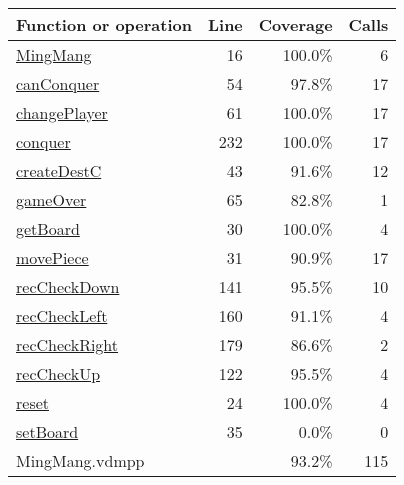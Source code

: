 \bigskip
\begin{longtable}{|l|r|r|r|}
\hline
Function or operation & Line & Coverage & Calls \\
\hline
\hline
\hyperref[MingMang:16]{MingMang} & 16&100.0\% & 6 \\
\hline
\hyperref[canConquer:54]{canConquer} & 54&97.8\% & 17 \\
\hline
\hyperref[changePlayer:61]{changePlayer} & 61&100.0\% & 17 \\
\hline
\hyperref[conquer:232]{conquer} & 232&100.0\% & 17 \\
\hline
\hyperref[createDestC:43]{createDestC} & 43&91.6\% & 12 \\
\hline
\hyperref[gameOver:65]{gameOver} & 65&82.8\% & 1 \\
\hline
\hyperref[getBoard:30]{getBoard} & 30&100.0\% & 4 \\
\hline
\hyperref[movePiece:31]{movePiece} & 31&90.9\% & 17 \\
\hline
\hyperref[recCheckDown:141]{recCheckDown} & 141&95.5\% & 10 \\
\hline
\hyperref[recCheckLeft:160]{recCheckLeft} & 160&91.1\% & 4 \\
\hline
\hyperref[recCheckRight:179]{recCheckRight} & 179&86.6\% & 2 \\
\hline
\hyperref[recCheckUp:122]{recCheckUp} & 122&95.5\% & 4 \\
\hline
\hyperref[reset:24]{reset} & 24&100.0\% & 4 \\
\hline
\hyperref[setBoard:35]{setBoard} & 35&0.0\% & 0 \\
\hline
\hline
MingMang.vdmpp & & 93.2\% & 115 \\
\hline
\end{longtable}

